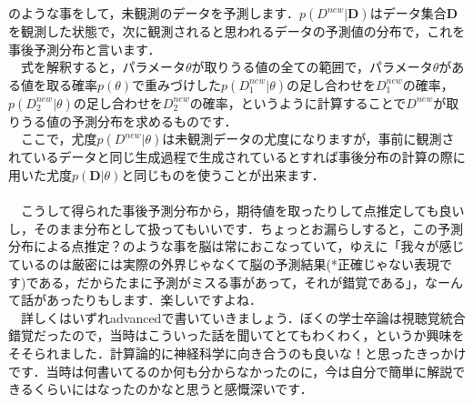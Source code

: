 \documentclass[11pt,a4paper,uplatex]{ujreport} 	%
\begin{document}
のような事をして，未観測のデータを予測します．$p(D^{new}|\mathbf{D})$はデータ集合$\mathbf{D}$を観測した状態で，次に観測されると思われるデータの予測値の分布で，これを事後予測分布と言います．\\
　式を解釈すると，パラメータ$\theta$が取りうる値の全ての範囲で，パラメータ$\theta$がある値を取る確率$p(\theta)$で重みづけした$p(D^{new}_1|\theta)$の足し合わせを$D^{new}_1$の確率，$p(D^{new}_2|\theta)$の足し合わせを$D^{new}_2$の確率，というように計算することで$D^{new}$が取りうる値の予測分布を求めるものです．\\
　ここで，尤度$p(D^{new}|\theta)$は未観測データの尤度になりますが，事前に観測されているデータと同じ生成過程で生成されているとすれば事後分布の計算の際に用いた尤度$p(\mathbf{D}|\theta)$と同じものを使うことが出来ます．\\
\\
　こうして得られた事後予測分布から，期待値を取ったりして点推定しても良いし，そのまま分布として扱ってもいいです．ちょっとお漏らしすると，この予測分布による点推定？のような事を脳は常におこなっていて，ゆえに「我々が感じているのは厳密には実際の外界じゃなくて脳の予測結果(*正確じゃない表現です)である，だからたまに予測がミスる事があって，それが錯覚である」，なーんて話があったりもします．楽しいですよね．\\
　詳しくはいずれadvancedで書いていきましょう．ぼくの学士卒論は視聴覚統合錯覚だったので，当時はこういった話を聞いてとてもわくわく，というか興味をそそられました．計算論的に神経科学に向き合うのも良いな！と思ったきっかけです．当時は何書いてるのか何も分からなかったのに，今は自分で簡単に解説できるくらいにはなったのかなと思うと感慨深いです．\\
\end{document}
